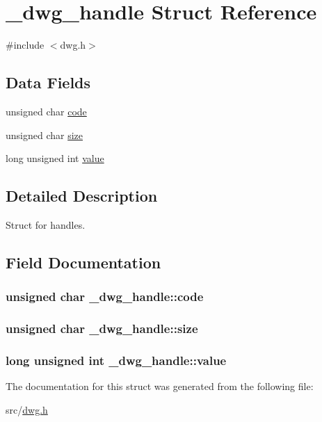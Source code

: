 \hypertarget{struct__dwg__handle}{\section{\-\_\-dwg\-\_\-handle \-Struct \-Reference}
\label{struct__dwg__handle}
}


{\ttfamily \#include $<$dwg.\-h$>$}

\subsection*{\-Data \-Fields}
\begin{DoxyCompactItemize}
\item 
unsigned char \hyperlink{struct__dwg__handle_af20781beec4e2abd02cdaa62fbbbb8a1}{code}
\item 
unsigned char \hyperlink{struct__dwg__handle_aa42b10a9e8492682764658dbd23a1bc5}{size}
\item 
long unsigned int \hyperlink{struct__dwg__handle_ab0caec0836d129bdf515120934e0c8df}{value}
\end{DoxyCompactItemize}


\subsection{\-Detailed \-Description}
\-Struct for handles. 

\subsection{\-Field \-Documentation}
\hypertarget{struct__dwg__handle_af20781beec4e2abd02cdaa62fbbbb8a1}{
\subsubsection[{code}]{\setlength{\rightskip}{0pt plus 5cm}unsigned char {\bf \-\_\-dwg\-\_\-handle\-::code}}}\label{struct__dwg__handle_af20781beec4e2abd02cdaa62fbbbb8a1}
\hypertarget{struct__dwg__handle_aa42b10a9e8492682764658dbd23a1bc5}{
\subsubsection[{size}]{\setlength{\rightskip}{0pt plus 5cm}unsigned char {\bf \-\_\-dwg\-\_\-handle\-::size}}}\label{struct__dwg__handle_aa42b10a9e8492682764658dbd23a1bc5}
\hypertarget{struct__dwg__handle_ab0caec0836d129bdf515120934e0c8df}{
\subsubsection[{value}]{\setlength{\rightskip}{0pt plus 5cm}long unsigned int {\bf \-\_\-dwg\-\_\-handle\-::value}}}\label{struct__dwg__handle_ab0caec0836d129bdf515120934e0c8df}


\-The documentation for this struct was generated from the following file\-:\begin{DoxyCompactItemize}
\item 
src/\hyperlink{dwg_8h}{dwg.\-h}\end{DoxyCompactItemize}
